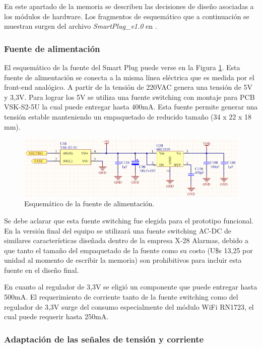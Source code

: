 En este apartado de la memoria se describen las decisiones de diseño asociadas a los módulos de hardware. Los fragmentos de esquemático que a continuación se muestran surgen del archivo \textit{SmartPlug\_v1.0} en \citep{repo_hardware}.

\subsubsection{Fuente de alimentación}

El esquemático de la fuente del Smart Plug puede verse en la Figura \ref{fig:pcb_fuente}. Esta fuente de alimentación se conecta a la misma línea eléctrica que es medida por el front-end analógico. A partir de la tensión de 220VAC genera una tensión de 5V y 3,3V. Para lograr los 5V se utiliza una fuente switching con montaje para PCB VSK-S2-5U la cual puede entregar hasta 400mA. Esta fuente permite generar una tensión estable manteniendo un empaquetado de reducido tamaño (34 x 22 x 18 mm). 

\begin{figure}[h]
	\centering
	\includegraphics[width=14cm]{./Figures/3_1_2_pcb_fuente.png}
	\caption{Esquemático de la fuente de alimentación.}
	\label{fig:pcb_fuente}
\end{figure}


Se debe aclarar que esta fuente switching fue elegida para el prototipo funcional. En la versión final del equipo se utilizará una fuente switching AC-DC de similares características diseñada dentro de la empresa X-28 Alarmas, debido a que tanto el tamaño del empaquetado de la fuente como su costo (U\$s 13,25 por unidad al momento de escribir la memoria) son prohibitivos para incluir esta fuente en el diseño final.

En cuanto al regulador de 3,3V se eligió un componente que puede entregar hasta 500mA. El requerimiento de corriente tanto de la fuente switching como del regulador de 3,3V surge del consumo especialmente del módulo WiFi RN1723, el cual puede requerir hasta 250mA.


\subsubsection{Adaptación de las señales de tensión y corriente}

